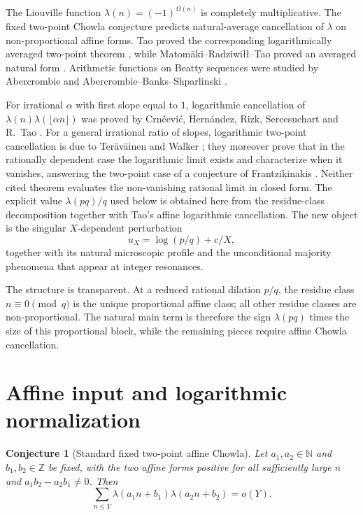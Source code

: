 \documentclass[preprint,12pt]{elsarticle}
\numberwithin{equation}{section}
\theoremstyle{plain}
\newtheorem{conjecture}[theorem]{Conjecture}
\theoremstyle{definition}
\theoremstyle{remark}
\begin{document}
The Liouville function $\lambda(n)=(-1)^{\Omega(n)}$ is completely
multiplicative. The fixed two-point Chowla conjecture predicts natural-average
cancellation of $\lambda$ on non-proportional affine forms. Tao proved the
corresponding logarithmically averaged two-point theorem
\cite{Tao2016}, while Matom\"aki--Radziwi{\l}{\l}--Tao proved an averaged
natural form \cite{MRT2015}. Arithmetic functions on Beatty sequences were
studied by Abercrombie \cite{Abercrombie1995} and
Abercrombie--Banks--Shparlinski \cite{AbercrombieBanksShparlinski2009}.

For irrational $\alpha$ with first slope equal to $1$, logarithmic
cancellation of
$\lambda(n)\lambda(\lfloor\alpha n\rfloor)$ was proved by
Crn\v{c}evi\'c, Hern\'andez, Rizk, Sereesuchart and R.~Tao
\cite{CHRST2024}. For a general irrational ratio of slopes, logarithmic
two-point cancellation is due to Ter\"av\"ainen and Walker
\cite[Theorem~1.2]{TeravainenWalker2025}; they moreover prove that in the
rationally dependent case the logarithmic limit exists and characterize when
it vanishes, answering the two-point case of a conjecture of Frantzikinakis
\cite{Frantzikinakis2020}. Neither cited theorem evaluates the non-vanishing
rational limit in closed form. The explicit value $\lambda(pq)/q$ used below
is obtained here from the residue-class decomposition together with Tao's
affine logarithmic cancellation. The new object is the singular
$X$-dependent perturbation
\[
u_X=\log(p/q)+c/X,
\]
together with its natural microscopic profile and the unconditional majority
phenomena that appear at integer resonances.

The structure is transparent. At a reduced rational dilation $p/q$, the
residue class $n\equiv0\pmod q$ is the unique proportional affine class; all
other residue classes are non-proportional. The natural main term is therefore
the sign $\lambda(pq)$ times the size of this proportional block, while the
remaining pieces require affine Chowla cancellation.

\section{Affine input and logarithmic normalization}
\label{sec:input}

\begin{conjecture}[Standard fixed two-point affine Chowla]
\label{conj:affine_chowla}
Let $a_1,a_2\in\mathbb N$ and $b_1,b_2\in\mathbb Z$ be fixed, with the two
affine forms positive for all sufficiently large $n$ and
$a_1b_2-a_2b_1\ne0$. Then
\[
\sum_{n\le Y}\lambda(a_1n+b_1)\lambda(a_2n+b_2)=o(Y).
\]
\end{conjecture}
\end{document}
